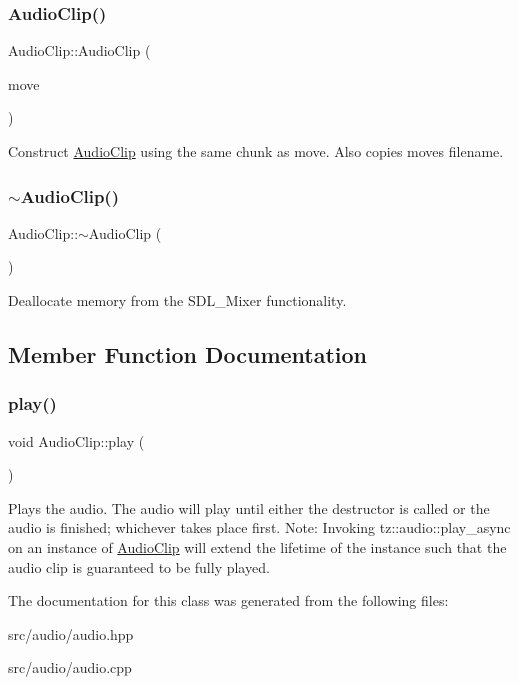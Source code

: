 \subsubsection{\texorpdfstring{Audio\+Clip()}{AudioClip()}\hspace{0.1cm}{\footnotesize\ttfamily [3/3]}}
{\footnotesize\ttfamily Audio\+Clip\+::\+Audio\+Clip (\begin{DoxyParamCaption}\item[{\mbox{\hyperlink{class_audio_clip}{Audio\+Clip}} \&\&}]{move }\end{DoxyParamCaption})}

Construct \mbox{\hyperlink{class_audio_clip}{Audio\+Clip}} using the same chunk as move. Also copies move\textquotesingle{}s filename. \mbox{\label{class_audio_clip_ab929796e463c51c50f2ad4e9acec35da}} 
\subsubsection{\texorpdfstring{$\sim$\+Audio\+Clip()}{~AudioClip()}}
{\footnotesize\ttfamily Audio\+Clip\+::$\sim$\+Audio\+Clip (\begin{DoxyParamCaption}{ }\end{DoxyParamCaption})\hspace{0.3cm}{\ttfamily [virtual]}}

Deallocate memory from the S\+D\+L\+\_\+\+Mixer functionality. 

\subsection{Member Function Documentation}
\mbox{\label{class_audio_clip_a615c3e8e6da9cdf8b98c1682135c2a75}} 
\subsubsection{\texorpdfstring{play()}{play()}}
{\footnotesize\ttfamily void Audio\+Clip\+::play (\begin{DoxyParamCaption}{ }\end{DoxyParamCaption})}

Plays the audio. The audio will play until either the destructor is called or the audio is finished; whichever takes place first. Note\+: Invoking tz\+::audio\+::play\+\_\+async on an instance of \mbox{\hyperlink{class_audio_clip}{Audio\+Clip}} will extend the lifetime of the instance such that the audio clip is guaranteed to be fully played. 

The documentation for this class was generated from the following files\+:\begin{DoxyCompactItemize}
\item 
src/audio/audio.\+hpp\item 
src/audio/audio.\+cpp\end{DoxyCompactItemize}
